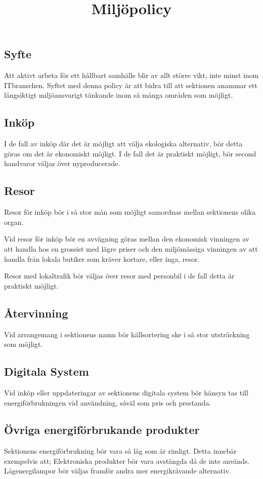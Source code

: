 \documentclass[11pt, includeaddress]{classes/cthit}
\begin{document}
\title{Miljöpolicy}
\maketitle

\thispagestyle{empty}

\newpage

\makeheadfoot%

\setcounter{tocdepth}{2}
\setcounter{page}{1}
\tableofcontents

\newpage

\subsection{Syfte}
Att aktivt arbeta för ett hållbart samhälle blir av allt större vikt, inte minst inom IT­branschen.
Syftet med denna policy är att bidra till att sektionen anammar ett långsiktigt miljöansvarigt
tänkande inom så många områden som möjligt.


\subsection{Inköp}
I de fall av inköp där det är möjligt att välja ekologiska alternativ, bör detta göras om det är
ekonomiskt möjligt.
I de fall det är praktiskt möjligt, bör second hand­varor väljas över nyproducerade.


\subsection{Resor}
Resor för inköp bör i så stor mån som möjligt samordnas mellan sektionens olika organ.

Vid resor för inköp bör en avvägning göras mellan den ekonomisk vinningen av att handla hos en
grossist med lägre priser och den miljömässiga vinningen av att handla från lokala butiker som
kräver kortare, eller inga, resor.

Resor med lokaltrafik bör väljas över resor med personbil i de fall detta är praktiskt möjligt.

\subsection{Återvinning}
Vid arrangemang i sektionens namn bör källsortering ske i så stor utsträckning som möjligt.

\subsection{Digitala System}
Vid inköp eller uppdateringar av sektionens digitala system bör hänsyn tas till
energiförbrukningen vid användning, såväl som pris och prestanda.

\subsection{Övriga energiförbrukande produkter}
Sektionens energiförbrukning bör vara så låg som är rimligt. Detta innebär exempelvis att;
Elektroniska produkter bör vara avstängda då de inte används.
Lågenergilampor bör väljas framför andra mer energikrävande alternativ.
\end{document}
